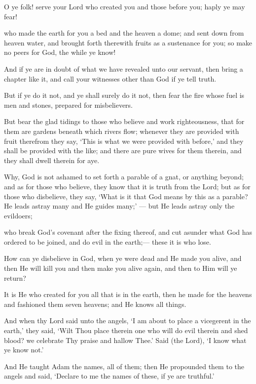 \documentclass[fontsize=14pt, letterpaper, notitlepage, openany, DIV=12]{scrbook} %
\begin{document}
\noindent[2:21]
O ye folk! serve your Lord who created you and those before you; haply ye may fear!

\noindent[2:22]
who made the earth for you a bed and the heaven a dome; and sent down from heaven
water, and brought forth therewith fruits as a sustenance for you; so make no peers for God, the
while ye know!

\noindent[2:23]
And if ye are in doubt of what we have revealed unto our servant, then bring a chapter
like it, and call your witnesses other than God if ye tell truth.

\noindent[2:24]
But if ye do it not, and ye shall surely do it not, then fear the fire whose fuel is men and
stones, prepared for misbelievers.

\noindent[2:25]
But bear the glad tidings to those who believe and work righteousness, that for them are
gardens beneath which rivers flow; whenever they are provided with fruit therefrom they say,
`This is what we were provided with before,' and they shall be provided with the like; and there
are pure wives for them therein, and they shall dwell therein for aye.

\noindent[2:26]
Why, God is not ashamed to set forth a parable of a gnat, or anything beyond; and as for
those who believe, they know that it is truth from the Lord; but as for those who disbelieve, they
say, `What is it that God means by this as a parable? He leads astray many and He guides many;'
--- but He leads astray only the evildoers;

\noindent[2:27]
who break God's covenant after the fixing thereof, and cut asunder what God has ordered
to be joined, and do evil in the earth;--- these it is who lose.

\noindent[2:28]
How can ye disbelieve in God, when ye were dead and He made you alive, and then He
will kill you and then make you alive again, and then to Him will ye return?

\noindent[2:29]
It is He who created for you all that is in the earth, then he made for the heavens and
fashioned them seven heavens; and He knows all things.

\noindent[2:30]
And when thy Lord said unto the angels, `I am about to place a vicegerent in the earth,'
they said, `Wilt Thou place therein one who will do evil therein and shed blood? we celebrate
Thy praise and hallow Thee.' Said (the Lord), `I know what ye know not.'

\noindent[2:31]
And He taught Adam the names, all of them; then He propounded them to the angels and
said, `Declare to me the names of these, if ye are truthful.'
\end{document}
